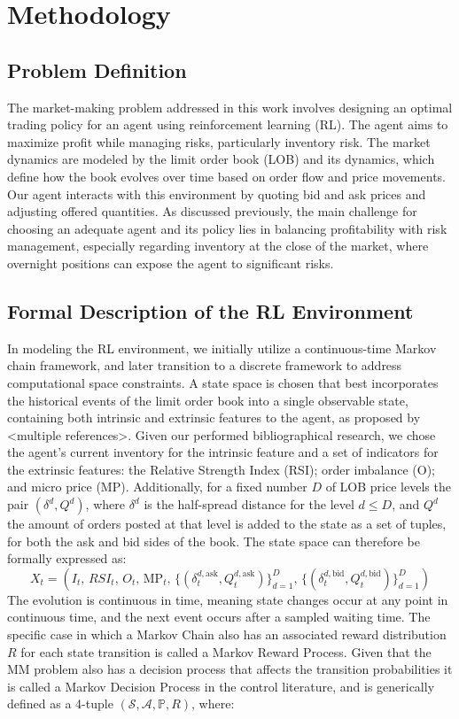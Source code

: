 \section{Methodology}

\subsection{Problem Definition}
The market-making problem addressed in this work involves designing an optimal trading policy for an agent using reinforcement learning (RL). The agent aims to maximize profit while managing risks, particularly inventory risk. The market dynamics are modeled by the limit order book (LOB) and its dynamics, which define how the book evolves over time based on order flow and price movements. Our agent interacts with this environment by quoting bid and ask prices and adjusting offered quantities. As discussed previously, the main challenge for choosing an adequate agent and its policy lies in balancing profitability with risk management, especially regarding inventory at the close of the market, where overnight positions can expose the agent to significant risks.

\subsection{Formal Description of the RL Environment} In modeling the RL environment, we initially utilize a continuous-time Markov chain framework, and later transition to a discrete framework to address computational space constraints. A state space is chosen that best incorporates the historical events of the limit order book into a single observable state, containing both intrinsic and extrinsic features to the agent, as proposed by <multiple references>. Given our performed bibliographical research, we chose the agent's current inventory for the intrinsic feature and a set of indicators for the extrinsic features: the Relative Strength Index (RSI); order imbalance (O); and micro price (MP). Additionally, for a fixed number $D$ of LOB price levels the pair $(\delta^d, Q^d)$, where $\delta^d$ is the half-spread distance for the level $d \leq D$, and $Q^d$ the amount of orders posted at that level is added to the state as a set of tuples, for both the ask and bid sides of the book. The state space can therefore be formally expressed as:
$$
X_t = (I_t, \, RSI_t, \, O_t, \, \text{MP}_t, \, \{ (\delta_t^{d, \text{ask}}, Q_t^{d, \text{ask}}) \}_{d=1}^D, \, \{ (\delta_t^{d, \text{bid}}, Q_t^{d, \text{bid}}) \}_{d=1}^D)
$$
The evolution is continuous in time, meaning state changes occur at any point in continuous time, and the next event occurs after a sampled waiting time. The specific case in which a Markov Chain also has an associated reward distribution $R$ for each state transition is called a Markov Reward Process. Given that the MM problem also has a decision process that affects the transition probabilities it is called a Markov Decision Process in the control literature, and is generically defined as a 4-tuple $ (\mathcal{S}, \mathcal{A}, \mathbb{P}, R) $, where:

